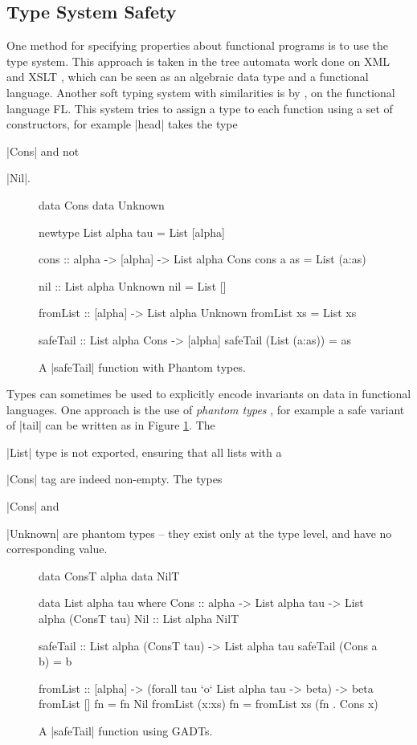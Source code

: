 \subsection{Type System Safety}

One method for specifying properties about functional programs is to use the type system. This approach is taken in the tree automata work done on XML and XSLT \cite{static_xslt}, which can be seen as an algebraic data type and a functional language. Another soft typing system with similarities is by \citet{aiken:type_infer}, on the functional language FL. This system tries to assign a type to each function using a set of constructors, for example |head| takes the type \ignore|Cons| and not \ignore|Nil|.

\begin{figure}
\begin{code}
data Cons
data Unknown

newtype List alpha tau = List [alpha]

cons :: alpha -> [alpha] -> List alpha Cons
cons a as = List (a:as)

nil :: List alpha Unknown
nil = List []

fromList :: [alpha] -> List alpha Unknown
fromList xs = List xs

safeTail :: List alpha Cons -> [alpha]
safeTail (List (a:as)) = as
\end{code}
\caption{A |safeTail| function with Phantom types.}
\label{figC:phantom}
\end{figure}

Types can sometimes be used to explicitly encode invariants on data in functional languages. One approach is the use of \textit{phantom types} \cite{fluet:phantom}, for example a safe variant of |tail| can be written as in Figure \ref{figC:phantom}. The \ignore|List| type is not exported, ensuring that all lists with a \ignore|Cons| tag are indeed non-empty. The types \ignore|Cons| and \ignore|Unknown| are phantom types -- they exist only at the type level, and have no corresponding value.

\begin{figure}
\ignore\begin{code}
data ConsT alpha
data NilT

data List alpha tau where
    Cons  :: alpha -> List alpha tau -> List alpha (ConsT tau)
    Nil   :: List alpha NilT

safeTail :: List alpha (ConsT tau) -> List alpha tau
safeTail (Cons a b) = b

fromList :: [alpha] -> (forall tau `o` List alpha tau -> beta) -> beta
fromList []      fn = fn Nil
fromList (x:xs)  fn = fromList xs (fn . Cons x)
\end{code}
\caption{A |safeTail| function using GADTs.}
\label{figC:gadt}
\end{figure}

